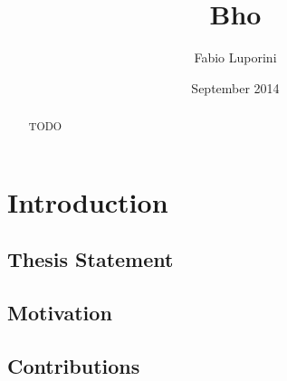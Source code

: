 


\title{Bho}
\author{Fabio Luporini}
\date{September 2014}
\dedication{}



\maketitle


\begin{abstract}

TODO

\end{abstract}


\makededication

\tableofcontents
\listoftables
\listoffigures

\mainmatter

\chapter{Introduction}

\section{Thesis Statement}

\section{Motivation}

\section{Contributions}

